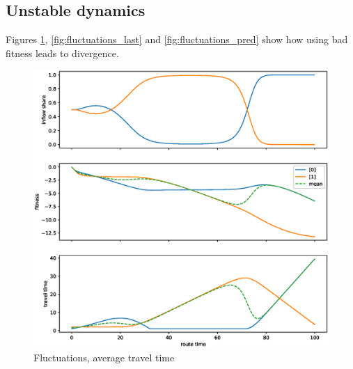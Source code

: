 \documentclass[12pt]{article}
\begin{document}
\newpage
\subsection*{Unstable dynamics}

Figures \ref{fig:fluctuations_avg}, \ref{fig:fluctuations_last} and \ref{fig:fluctuations_pred} show how using bad fitness leads to divergence.

\begin{center}
	\begin{figure}
	\includegraphics[scale=0.5]{img/replicator_avg_tt.eps}
	\caption{Fluctuations, average travel time }
	\label{fig:fluctuations_avg}

	\end{figure}
	
\end{center}
\end{document}
